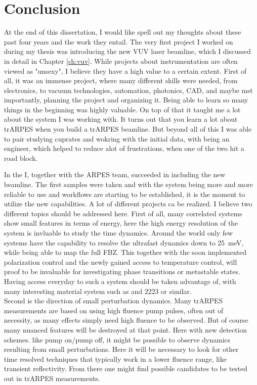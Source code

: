 \cleardoublepage
\chapter*{Conclusion}

At the end of this dissertation, I would like spell out my thoughts about these past four years and the work they entail.
The very first project I worked on during my thesis was introducing the new VUV laser beamline, which I discussed in detail in Chapter \ref{ch:vuv}.
While projects about instrumentation are often viewed as "unsexy", I believe they have a high value to a certain extent.
First of all, it was an immense project, where many different skills were needed, from electronics, to vacuum technologies, automation, photonics, CAD, and maybe mst importantly, planning the project and organizing it.
Being able to learn so many things in the beginning was highly valuable.
On top of that it taught me a lot about the system I was working with.
It turns out that you learn a lot about trARPES when you build a trARPES beamline.
But beyond all of this I was able to pair studying cuprates and wokring with the initial data, with being an engineer, which helped to reduce alot of frustrations, when one of the two hit a road block.

In the I, together with the ARPES team, succeeded in including the new beamline.
The first samples were taken and with the system being more and more reliable to use and workflows are starting to be established, it is the moment to utilize the new capabilities.
A lot of different projects ca be realized.
I believe two different topics should be addressed here.
First of all, many correlated systems show small features in terms of energy, here the high energy resolution of the system is invluable to study the time dynamics.
Around the world only few systems have the capability to resolve the ultrafast dynamics down to \qty{25}{\milli\electronvolt}, while being able to map the full FBZ.
This together with the soon implemented polarization control and the newly gained access to temperature control, will proof to be invaluable for investigating phase transitions or metastable states.
Having access everyday to such a system should be taken advantage of, with many interesting material system such as  and 2223 or similar.\\
Second is the direction of small perturbation dynamics.
Many trARPES measurements are based on using high fluence pump pulses, often out of necessity, as many effects simply need high fluence to be observed.
But of course many nuanced features will be destroyed at that point.
Here with new detection schemes. like pump on/pump off, it might be possible to observe dynamics resulting from small perturbations.
Here it will be necessary to look for other time resolved techniques that typically work in a lower fluence range, like transient reflectivity.
From there one might find possible candidates to be tested out in trARPES measurements.

